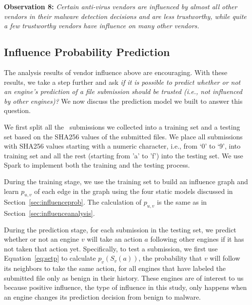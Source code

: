 {\bf Observation 8:} 
{\em Certain anti-virus vendors are influenced by almost all other vendors in their malware detection decisions and are less trustworthy, 
while quite a few trustworthy vendors have influence on many other vendors.}

\subsection{Influence Probability Prediction}
\label{sec:predict}

The analysis results of vendor influence above are encouraging.
With these results, we take a step further and ask 
{\em if it is possible to predict whether or not an engine's prediction of 
a file submission should be trusted (i.e., not influenced by other engines)?}
We now discuss the prediction model we built to answer this question.

We first split all the \pe\ submissions we collected into a training set and a testing set based on 
the SHA256 values of the submitted files. 
We place all submissions with SHA256 values starting with a numeric character, 
i.e., from `0' to `9', into training set
and all the rest (starting from 'a' to 'f') into the testing set.
We use Spark to implement both the training and the testing process.


During the training stage, we use the training set to build an influence graph and
learn $p_{u,v}$ of each edge in the graph using the four static models discussed in Section~\ref{sec:influenceprob}.
The calculation of $p_{u,v}$ is the same as in Section~\ref{sec:influenceanalysis}.

During the prediction stage, for each submission in the testing set, 
we predict whether or not an engine $v$ will take an action $a$ following other engines 
if it has not taken that action yet. 
Specifically, to test a submission, we first use Equation~\ref{eq:setp} to
calculate $p_v(S_v(a))$, the probability that $v$ will follow its neighbors to take the same action, 
for all engines that have labeled the submitted file only as benign in their history. 
These engines are of interest to us because positive influence, 
the type of influence in this study, only happens 
when an engine changes its prediction decision from benign to malware.


